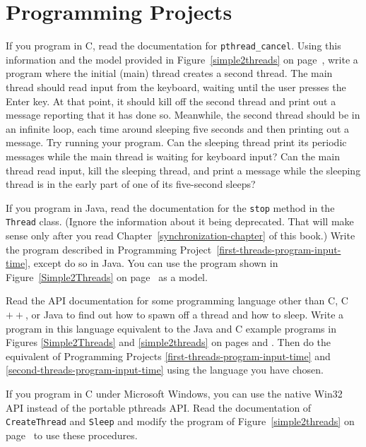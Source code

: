 \section*{Programming Projects}
\begin{chapterEnumerate}
\item\label{first-threads-program-input-time}
If
you program in C, read the documentation for
\verb|pthread_cancel|. 
Using this information and the model provided in
Figure~\ref{simple2threads} on page~\pageref{simple2threads},
write a program where the initial
(main) thread creates a second thread.  The main thread should
read input from the keyboard, waiting until the user presses the Enter key.  At that point, it should kill off the
second thread and print out a message reporting that it has done so.
Meanwhile, the second thread should be in an infinite loop, each time
around sleeping five seconds and then printing out a message.  Try
running your program.  Can the sleeping thread print its periodic
messages while the main thread is waiting for keyboard input?  Can the
main thread read input, kill the sleeping thread, and print a message
while the sleeping thread is in the early part of one of its
five-second sleeps?
\item\label{second-threads-program-input-time}
If you
program in Java, read the documentation for the
\verb|stop| method in the \verb|Thread|
class.  (Ignore the information about it being deprecated.  That will
make sense only after you read Chapter~\ref{synchronization-chapter} of
this book.)  Write the program described in Programming Project~\ref{first-threads-program-input-time},
except do so in Java.  You can use the program shown in
Figure~\ref{Simple2Threads} on page~\pageref{Simple2Threads} as a model.
\item\label{third-threads-program-input-time}
Read the API documentation for some programming language other than C,
C$++$, or Java to find out how to spawn off a thread and how to
sleep.  Write a program in this language equivalent to the Java and C
example programs in Figures \ref{Simple2Threads} and
\ref{simple2threads} on pages \pageref{Simple2Threads} and
\pageref{simple2threads}.  Then do the equivalent of Programming
Projects \ref{first-threads-program-input-time} and \ref{second-threads-program-input-time} using the language you have chosen.
\item\label{win32-threads-program}
If you program in C under Microsoft Windows, you can use the
native Win32 API instead of the portable pthreads API. Read the
documentation of \verb|CreateThread| and \verb|Sleep| and modify the
program of Figure~\ref{simple2threads} on
page~\pageref{simple2threads} to use these procedures.
\end{chapterEnumerate}

